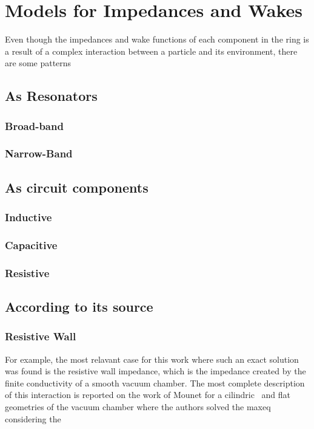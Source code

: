 \section{Models for Impedances and Wakes}

    Even though the impedances and wake functions of each component in the ring is a result of a complex interaction between a particle and its environment, there are some patterns

\subsection{As Resonators}
\subsubsection{Broad-band}
\subsubsection{Narrow-Band}
\subsection{As circuit components}
\subsubsection{Inductive}
\subsubsection{Capacitive}
\subsubsection{Resistive}
\subsection{According to its source}
\subsubsection{Resistive Wall}
	For example, the most relavant case for this work where such an exact solution was found is the resistive wall impedance, which is the impedance created by the finite conductivity of a smooth vacuum chamber.
	The most complete description of this interaction is reported on the work of Mounet for a 	cilindric~\cite{Mounet2009} and flat~\cite{Mounet2010} geometries of the vacuum chamber where the authors solved the \gls{maxeq} considering the
